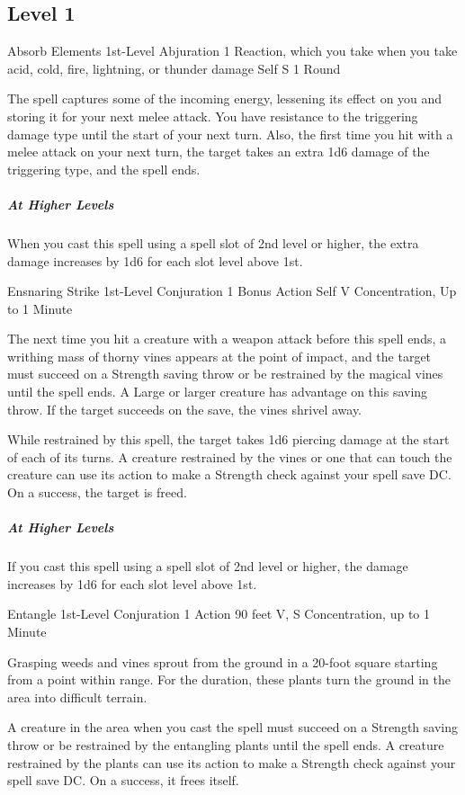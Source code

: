 {\subsection*{Level 1}

\DndSpellHeader
  {Absorb Elements}
  {1st-Level Abjuration}
  {1 Reaction, which you take when you take acid, cold, fire, lightning, or thunder damage}
  {Self}
  {S}
  {1 Round}

The spell captures some of the incoming energy, lessening its effect on you and storing it for your next melee attack. You have resistance to the triggering damage type until the start of your next turn. Also, the first time you hit with a melee attack on your next turn, the target takes an extra 1d6 damage of the triggering type, and the spell ends.

\subparagraph*{At Higher Levels} When you cast this spell using a spell slot of 2nd level or higher, the extra damage increases by 1d6 for each slot level above 1st.


\DndSpellHeader
  {Ensnaring Strike}
  {1st-Level Conjuration}
  {1 Bonus Action}
  {Self}
  {V}
  {Concentration, Up to 1 Minute}

The next time you hit a creature with a weapon attack before this spell ends, a writhing mass of thorny vines appears at the point of impact, and the target must succeed on a Strength saving throw or be restrained by the magical vines until the spell ends. A Large or larger creature has advantage on this saving throw. If the target succeeds on the save, the vines shrivel away.

While restrained by this spell, the target takes 1d6 piercing damage at the start of each of its turns. A creature restrained by the vines or one that can touch the creature can use its action to make a Strength check against your spell save DC. On a success, the target is freed.

\subparagraph*{At Higher Levels} If you cast this spell using a spell slot of 2nd level or higher, the damage increases by 1d6 for each slot level above 1st.

\DndSpellHeader
  {Entangle}
  {1st-Level Conjuration}
  {1 Action}
  {90 feet}
  {V, S}
  {Concentration, up to 1 Minute}

Grasping weeds and vines sprout from the ground in a 20-foot square starting from a point within range. For the duration, these plants turn the ground in the area into difficult terrain.

A creature in the area when you cast the spell must succeed on a Strength saving throw or be restrained by the entangling plants until the spell ends. A creature restrained by the plants can use its action to make a Strength check against your spell save DC. On a success, it frees itself.

}
